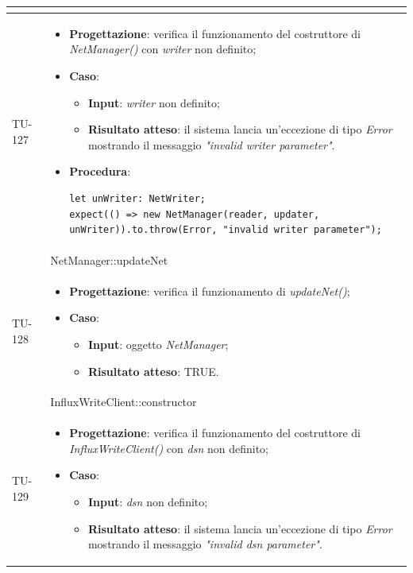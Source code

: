 \begin{longtable}{|C{1.5cm}|C{14.5cm}|}
\begin{itemize}
\end{itemize}\\
\hline
{TU-127} &
\begin{itemize}
	\item \textbf{Progettazione}: verifica il funzionamento del costruttore di \emph{NetManager()} con \emph{writer} non definito;
	\item \textbf{Caso}: 
	\begin{itemize}
		\item \textbf{Input}: \emph{writer} non definito;
		\item \textbf{Risultato atteso}: il sistema lancia un'eccezione di tipo \emph{Error} mostrando il messaggio \emph{"invalid writer parameter"}.
	\end{itemize}
	\item \textbf{Procedura}:
	\begin{lstlisting}
let unWriter: NetWriter;
expect(() => new NetManager(reader, updater, unWriter)).to.throw(Error, "invalid writer parameter");
	\end{lstlisting}
\end{itemize}\\
\hline
{} & NetManager::updateNet
\\ \hline
{TU-128} &
\begin{itemize}
	\item \textbf{Progettazione}: verifica il funzionamento di \emph{updateNet()};
	\item \textbf{Caso}: 
	\begin{itemize}
		\item \textbf{Input}: oggetto \emph{NetManager};
		\item \textbf{Risultato atteso}: TRUE.
	\end{itemize}
\end{itemize}\\
\hline
{} & InfluxWriteClient::constructor
\\ \hline
{TU-129} &
\begin{itemize}
	\item \textbf{Progettazione}: verifica il funzionamento del costruttore di \emph{InfluxWriteClient()} con \emph{dsn} non definito;
	\item \textbf{Caso}: 
	\begin{itemize}
		\item \textbf{Input}: \emph{dsn} non definito;
		\item \textbf{Risultato atteso}: il sistema lancia un'eccezione di tipo \emph{Error} mostrando il messaggio \emph{"invalid dsn parameter"}.

\end{itemize}
\end{itemize}
\end{longtable}
